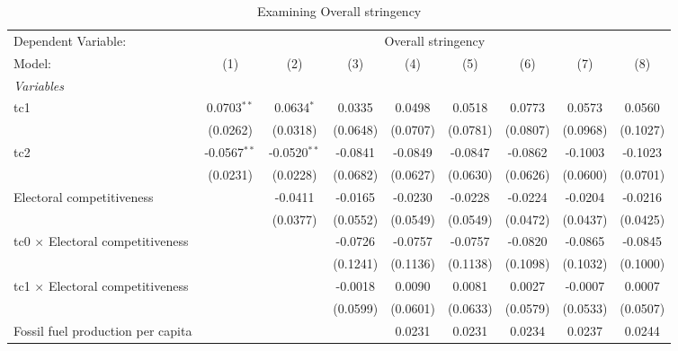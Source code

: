 
\begin{table}[htbp]
   \caption{Examining Overall stringency}
   \centering
   \begin{tabular}{lcccccccc}
      \tabularnewline \midrule \midrule
      Dependent Variable: & \multicolumn{8}{c}{Overall stringency}\\
      Model:                                  & (1)            & (2)            & (3)      & (4)      & (5)      & (6)      & (7)      & (8)\\  
      \midrule
      \emph{Variables}\\
      tc1                                     & 0.0703$^{**}$  & 0.0634$^{*}$   & 0.0335   & 0.0498   & 0.0518   & 0.0773   & 0.0573   & 0.0560\\   
                                              & (0.0262)       & (0.0318)       & (0.0648) & (0.0707) & (0.0781) & (0.0807) & (0.0968) & (0.1027)\\   
      tc2                                     & -0.0567$^{**}$ & -0.0520$^{**}$ & -0.0841  & -0.0849  & -0.0847  & -0.0862  & -0.1003  & -0.1023\\   
                                              & (0.0231)       & (0.0228)       & (0.0682) & (0.0627) & (0.0630) & (0.0626) & (0.0600) & (0.0701)\\   
      Electoral competitiveness               &                & -0.0411        & -0.0165  & -0.0230  & -0.0228  & -0.0224  & -0.0204  & -0.0216\\   
                                              &                & (0.0377)       & (0.0552) & (0.0549) & (0.0549) & (0.0472) & (0.0437) & (0.0425)\\   
      tc0 $\times$ Electoral competitiveness  &                &                & -0.0726  & -0.0757  & -0.0757  & -0.0820  & -0.0865  & -0.0845\\   
                                              &                &                & (0.1241) & (0.1136) & (0.1138) & (0.1098) & (0.1032) & (0.1000)\\   
      tc1 $\times$ Electoral competitiveness  &                &                & -0.0018  & 0.0090   & 0.0081   & 0.0027   & -0.0007  & 0.0007\\   
                                              &                &                & (0.0599) & (0.0601) & (0.0633) & (0.0579) & (0.0533) & (0.0507)\\   
      Fossil fuel production per capita       &                &                &          & 0.0231   & 0.0231   & 0.0234   & 0.0237   & 0.0244\\   

\end{tabular}
\end{table}
